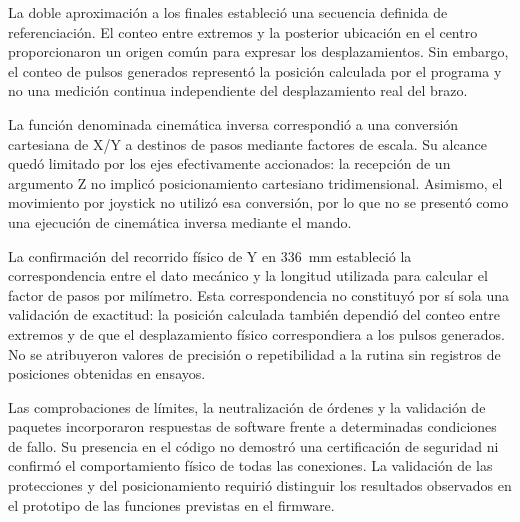 La doble aproximación a los finales estableció una secuencia definida de referenciación. El conteo entre extremos y la posterior ubicación en el centro proporcionaron un origen común para expresar los desplazamientos. Sin embargo, el conteo de pulsos generados representó la posición calculada por el programa y no una medición continua independiente del desplazamiento real del brazo.

La función denominada cinemática inversa correspondió a una conversión cartesiana de X/Y a destinos de pasos mediante factores de escala. Su alcance quedó limitado por los ejes efectivamente accionados: la recepción de un argumento Z no implicó posicionamiento cartesiano tridimensional. Asimismo, el movimiento por joystick no utilizó esa conversión, por lo que no se presentó como una ejecución de cinemática inversa mediante el mando.

La confirmación del recorrido físico de Y en 336~mm estableció la correspondencia entre el dato mecánico y la longitud utilizada para calcular el factor de pasos por milímetro. Esta correspondencia no constituyó por sí sola una validación de exactitud: la posición calculada también dependió del conteo entre extremos y de que el desplazamiento físico correspondiera a los pulsos generados. No se atribuyeron valores de precisión o repetibilidad a la rutina sin registros de posiciones obtenidas en ensayos.

Las comprobaciones de límites, la neutralización de órdenes y la validación de paquetes incorporaron respuestas de software frente a determinadas condiciones de fallo. Su presencia en el código no demostró una certificación de seguridad ni confirmó el comportamiento físico de todas las conexiones. La validación de las protecciones y del posicionamiento requirió distinguir los resultados observados en el prototipo de las funciones previstas en el firmware.
